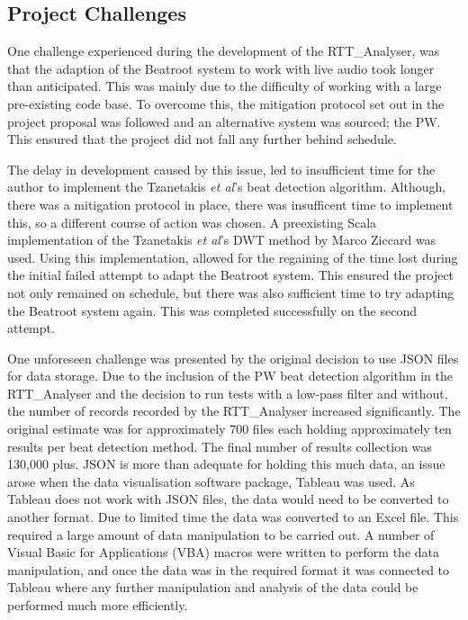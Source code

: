 \documentclass[a4paper, 11pt]{article}
\begin{document}
\subsection{Project Challenges}

One challenge experienced during the development of the RTT\_Analyser, was that the adaption of the Beatroot system to work with live audio took longer than anticipated. This was mainly due to the difficulty of working with a large pre-existing code base. To overcome this, the mitigation protocol set out in the project proposal was followed and an alternative system was sourced; the PW. This ensured that the project did not fall any further behind schedule.\par 

The delay in development caused by this issue, led to insufficient time for the author to implement the Tzanetakis \textit{et al}'s \cite{tzane1} beat detection algorithm. Although, there was a mitigation protocol in place, there was insufficent time to implement this, so a different course of action was chosen. A preexisting Scala implementation of the Tzanetakis \textit{et al}'s \cite{tzane1} DWT method by Marco Ziccard\cite{marcoZin} was used. Using this implementation, allowed for the regaining of the time lost during the initial failed attempt to adapt the Beatroot system. This ensured the project not only remained on schedule, but there was also sufficient time to try adapting the Beatroot system again. This was completed successfully on the second attempt.\par

One unforeseen challenge was presented by the original decision to use JSON files for data storage. Due to the inclusion of the PW beat detection algorithm in the RTT\_Analyser and the decision to run tests with a low-pass filter and without, the number of records recorded by the RTT\_Analyser increased significantly. The original estimate was for approximately 700 files each holding approximately ten results per beat detection method. The final number of results collection was 130,000 plus. JSON is more than adequate for holding this much data, an issue arose when the data visualisation software package, Tableau\cite{tableau} was used. As Tableau does not work with JSON files, the data would need to be converted to another format. Due to limited time the data was converted to an Excel\cite{excel} file. This required a large amount of data manipulation to be carried out. A number of Visual Basic for Applications (VBA) macros were written to perform the data manipulation, and once the data was in the required format it was connected to Tableau where any further manipulation and analysis of the data could be performed much more efficiently. 
\end{document}
